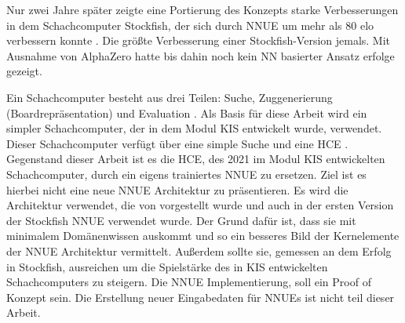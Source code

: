 Nur zwei Jahre später zeigte eine Portierung des Konzepts starke Verbesserungen in dem Schachcomputer Stockfish, der sich durch \ac{NNUE} um mehr als 80 elo verbessern konnte \cite{StockfishIntroducingNNUE}. Die größte Verbesserung einer Stockfish-Version jemals. Mit Ausnahme von AlphaZero \cite{Silver2017} hatte bis dahin noch kein \ac{NN} basierter Ansatz erfolge gezeigt.


Ein Schachcomputer besteht aus drei Teilen: Suche, Zuggenerierung (Boardrepräsentation) und Evaluation \cite{VazquezFernandez2013}. Als Basis für diese Arbeit wird ein simpler Schachcomputer, der in dem Modul \ac{KIS} entwickelt wurde, verwendet. Dieser Schachcomputer verfügt über eine simple Suche und eine \ac{HCE} \cite{nopy}. Gegenstand dieser Arbeit ist es die \ac{HCE}, des 2021 im Modul \ac{KIS} entwickelten Schachcomputer, durch ein eigens trainiertes \ac{NNUE} zu ersetzen. Ziel ist es hierbei nicht eine neue \ac{NNUE} Architektur zu präsentieren. Es wird die Architektur verwendet, die von \citeauthor{YNasu2018} \cite{YNasu2018} vorgestellt wurde und auch in der ersten Version der Stockfish \ac{NNUE} verwendet wurde. Der Grund dafür ist, dass sie mit minimalem Domänenwissen auskommt und so ein besseres Bild der Kernelemente der \ac{NNUE} Architektur vermittelt. Außerdem sollte sie, gemessen an dem Erfolg in Stockfish, ausreichen um die Spielstärke des in \ac{KIS} entwickelten Schachcomputers zu steigern.
Die \ac{NNUE} Implementierung, soll ein Proof of Konzept sein. Die Erstellung neuer Eingabedaten für \acp{NNUE} ist nicht teil dieser Arbeit.